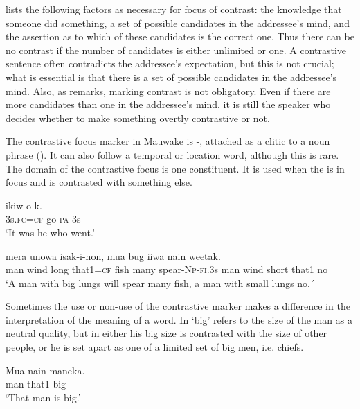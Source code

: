 \citet{Chafe1976} lists the following factors as necessary for focus of contrast: the knowledge that someone did something, a set of possible candidates in the addressee's mind, and the assertion as to which of these candidates is the correct one. Thus there can be no contrast if the number of candidates is either unlimited or one. A contrastive sentence often contradicts the addressee's expectation, but this is not crucial; what is essential is that there is a set of possible candidates in the addressee's mind. Also, as  \citet[348]{Linde1979} remarks, marking contrast is not obligatory. Even if there are more candidates than one in the addressee's mind, it is still the speaker who decides whether to make something overtly contrastive or not.  

The contrastive focus marker in Mauwake is -, attached as a clitic to a noun phrase (). It can also follow a temporal or location word, although this is rare. The domain of the contrastive focus is one constituent. It is used when the  is in focus and is contrasted with something else. 

\ea%
\label{ex:9:x1688}
\gll {}  ikiw-o-k. \\
3s.\textsc{fc}=\textsc{cf}  go-\textsc{pa}-3s      \\
\glt`It was he who went.'
\z


\ea%
\label{ex:9:x1689}
\gll {}     mera  unowa  isak-i-non, mua  bug  iiwa  nain  weetak. \\
man  wind  long  that1=\textsc{cf}  fish  many  spear-\textsc{Np}-\textsc{fi}.3s man  wind  short  that1  no\\
\glt`A man with big lungs will spear many fish, a man with small lungs no.´ 
\z


Sometimes the use or non-use of the contrastive marker makes a difference in the interpretation of the meaning of a word. In   `big' refers to the size of the man as a neutral quality, but in  either his big size is contrasted with the size of other people, or he is set apart as one of a limited set of big men, i.e. chiefs. 

\ea%
\label{ex:9:x1690}
\gll Mua  nain  maneka. \\
man  that1  big      \\
\glt`That man is big.'
\z


